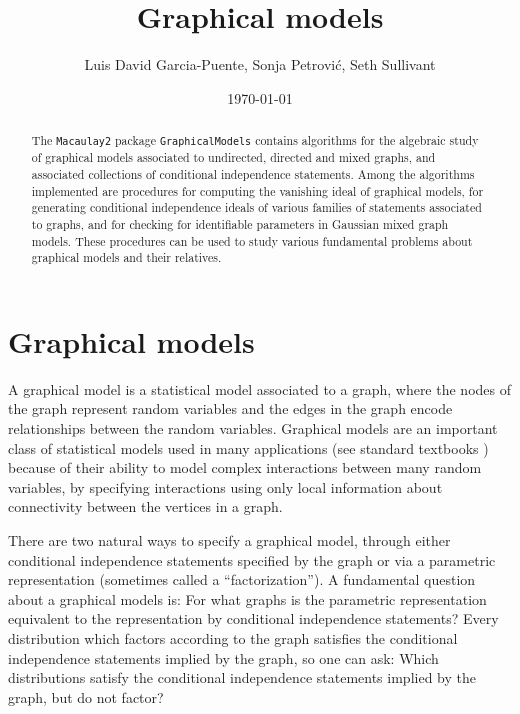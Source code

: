 \documentclass[letterpaper]{article}
\title{Graphical models}
\author{Luis David Garcia-Puente, Sonja Petrovi\'c, Seth Sullivant}
\date{\today}
\theoremstyle{definition}
\begin{document}
\maketitle
\begin{abstract}
The {\tt Macaulay2} package {\tt GraphicalModels} contains algorithms 
for the algebraic study of graphical models associated to undirected, 
directed and mixed graphs, and associated collections of 
conditional independence statements. 
Among the algorithms implemented are procedures for computing
the vanishing ideal of graphical models, for generating
conditional independence ideals of various families of statements
associated to graphs, and for checking for identifiable parameters
in Gaussian mixed graph models.
These procedures can be used to study various fundamental 
problems about graphical models and their relatives. 
\end{abstract}


\section{Graphical models}
A graphical model is a statistical model associated to a graph,
where the nodes of the graph represent random variables and the
edges in the graph encode relationships between the random variables.
Graphical models are an important class of statistical models used
in many applications (see standard textbooks \cite{Lauritzen, Whitaker})
because of their ability to model complex interactions between
many random variables, by specifying
interactions using only local information about connectivity
between the vertices in a graph.

There are two natural ways to specify a graphical model, through 
either conditional independence statements specified by the graph
or via a parametric representation (sometimes called a ``factorization'').
A fundamental question about a graphical models is: For what
graphs is the parametric representation equivalent to the
representation by conditional independence statements?
Every distribution which factors according to the graph
satisfies the conditional independence statements implied by the 
graph, so one can ask:  Which distributions satisfy the conditional
independence statements implied by the graph, but do not factor?
\end{document}

